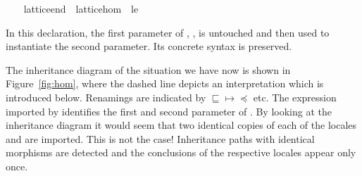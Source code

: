 \begin{isabellebody}
\begin{isamarkuptext}
\end{isamarkuptext}%
\isamarkuptrue%
\ \ \isamarkupfalse%
\ lattice{\isacharunderscore}end\ {\isacharequal}\ lattice{\isacharunderscore}hom\ {\isacharunderscore}\ le%
\begin{isamarkuptext}%
In this declaration, the first parameter of , , is untouched and then used to instantiate
  the second parameter.  Its concrete syntax is preserved.%
\end{isamarkuptext}%
\isamarkuptrue%
%
\begin{isamarkuptext}%
The inheritance diagram of the situation we have now is shown
  in Figure~\ref{fig:hom}, where the dashed line depicts an
  interpretation which is introduced below.  Renamings are
  indicated by $\sqsubseteq \mapsto \preceq$ etc.  The expression
  imported by  identifies the first and second
  parameter of .  By looking at the inheritance diagram it would seem
  that two identical copies of each of the locales  and  are imported.  This is not the
  case!  Inheritance paths with identical morphisms are detected and
  the conclusions of the respective locales appear only once.


\end{isamarkuptext}
\end{isabellebody}
